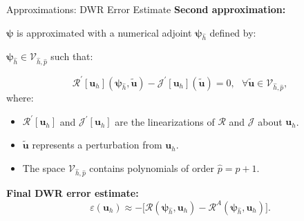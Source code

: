 \documentclass{beamer}
\newcounter{sectionframecount}
\begin{document}
\begin{frame}[t]{Approximations: DWR Error Estimate}
  \vspace{-5pt}
  \textbf{Second approximation:}

  \vspace{10pt}
  $\boldsymbol{\psi}$ is approximated with a numerical adjoint $\boldsymbol{\psi}_{\hat{h}}$ defined by\footnotemark:

  {
  $\boldsymbol{\psi}_{\hat{h}} \in \mathcal{V}_{\hat{h},\hat{p}}$ such that:

  \begin{equation}
    \mathcal{R}^\prime[\boldsymbol{u}_h](\boldsymbol{\psi}_{\hat{h}},\tilde{\boldsymbol{u}}) - \mathcal{J}^\prime[\boldsymbol{u}_h](\tilde{\boldsymbol{u}}) = 0,~~~\forall \tilde{\boldsymbol{u}} \in \mathcal{V}_{\hat{h},\hat{p}},
  \end{equation}
  where:

  \begin{itemize}
    \item $\mathcal{R}^\prime[\boldsymbol{u}_h]$ and $\mathcal{J}^\prime[\boldsymbol{u}_h]$ are the linearizations of $\mathcal{R}$ and $\mathcal{J}$ about $\boldsymbol{u}_h$.
    \item $\tilde{\boldsymbol{u}}$ represents a perturbation from $\boldsymbol{u}_h$.
    \item The space $\mathcal{V}_{\hat{h},\hat{p}}$ contains polynomials of order $\hat{p}=p+1$.
  \end{itemize}
  }

  {
  \vspace{10pt}
  \textbf{Final DWR error estimate:}
  \begin{equation}
    \varepsilon(\boldsymbol{u}_h) \approx -\Big[\mathcal{R}(\boldsymbol{\psi}_{\hat{h}},\boldsymbol{u}_h) - \mathcal{R}^A(\boldsymbol{\psi}_{\hat{h}},\boldsymbol{u}_h)\Big].
  \end{equation}
  }

\end{frame}

\end{document}
